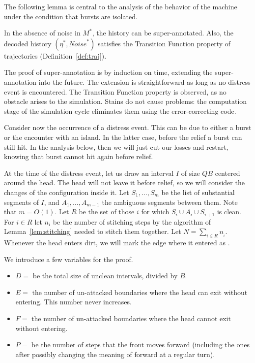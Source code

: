 \documentclass[12pt]{memoir}
\def\B{B}
\newcommand{\Noise}{\mathit{Noise}}
\newcommand{\Q}{Q}
\begin{document}
The following lemma is central to the analysis of the behavior of the machine under the condition that 
bursts are isolated.

\begin{lemma}[Healing]\label{lem:healing}
In the absence of noise in \( M^{*} \), the history can be super-annotated.
Also, the decoded history \( (\eta^{*},\Noise^{*}) \) satisfies the Transition Function property 
of trajectories (Definition~\ref{def:traj}).
\end{lemma}
\begin{Proof}
The proof of super-annotation is by induction on time, extending the super-annotation into the future.
The extension is straightforward as long as no distress event is encountered.
The Transition Function property is observed, as no obstacle arises to the simulation.
Stains do not cause problems: the computation stage of the simulation cycle eliminates them
using the error-correcting code.

Consider now the occurrence of a distress event.
This can be due to either a burst or the encounter with an island.
In the latter case, before the relief a burst can still hit.
In the analysis below, then we will just cut our losses and restart, knowing that 
burst cannot hit again before relief.

At the time of the distress event, let us draw an interval \( I \) of size \( \Q\B \) centered 
around the head.
The head will not leave it before relief, so we will consider the changes of 
the configuration inside it.
Let \( S_{1},\dots,S_{m} \) be the list of substantial segments of \( I \), 
and \( A_{1},\dots,A_{m-1} \) the ambiguous segments between them.
Note that \( m=O(1) \).
Let \( R \) be the set of those \( i \) for which \( S_{i}\cup A_{i}\cup S_{i+1} \) is clean.
For \( i\in R \) let \( n_{i} \) be the number of 
stitching steps by the algorithm of Lemma~\ref{lem:stitching} needed to stitch them 
together.
Let \( N=\sum_{i\in R} n_{_{i}} \).
Whenever the head enters dirt, we will mark the edge where it entered as .

We introduce a few variables for the proof.
\begin{itemize}
\item\( D= \) be the total size of unclean intervals, divided by \( \B \).
\item\( E= \) the number of un-attacked boundaries where the head can exit without entering.
  This number never increases.
\item \( F= \) the number of un-attacked boundaries where the head cannot exit without entering.
\item \( P= \) be the number of steps that the front moves forward (including the ones after possibly
changing the meaning of forward at a regular turn).
\end{itemize}


\end{Proof}
\end{document}
